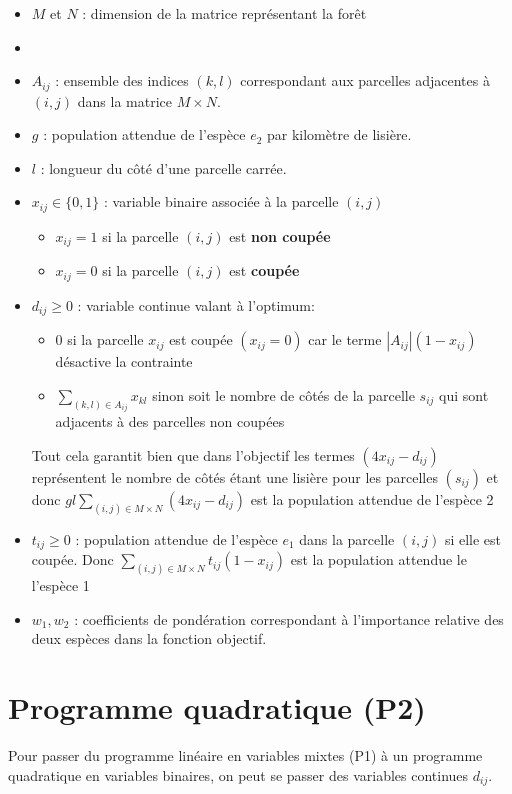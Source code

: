 \documentclass[a4paper,11pt]{article}
\begin{document}
\begin{itemize}
    \item $M$ et $N$ : dimension de la matrice représentant la forêt
    \item \item $A_{ij}$ : ensemble des indices $(k,l)$ correspondant aux parcelles adjacentes à $(i,j)$ dans la matrice $M \times N$.
    \item $g$ : population attendue de l'espèce $e_2$ par kilomètre de lisière.
    \item $l$ : longueur du côté d’une parcelle carrée.
    \item $x_{ij} \in \{0,1\}$ : variable binaire associée à la parcelle $(i,j)$
    \begin{itemize}
        \item $x_{ij} = 1$ si la parcelle $(i,j)$ est \textbf{non coupée}
        \item $x_{ij} = 0$ si la parcelle $(i,j)$ est \textbf{coupée}
    \end{itemize}

    \item {$d_{ij} \ge 0$ : variable continue valant à l'optimum:
    
    \begin{itemize}
    \item $0$ si la parcelle $x_{ij}$ est coupée $(x_{ij} = 0)$ car le terme $|A_{ij}|(1-x_{ij})$ désactive la contrainte
    \item $\sum_{(k,l)\in A_{ij}} x_{kl}$ sinon soit le nombre de côtés de la parcelle $s_{ij}$ qui sont adjacents à des parcelles non coupées 
    \end{itemize} 
    
    Tout cela garantit bien que dans l'objectif les termes $(4x_{ij} - d_{ij})$ représentent le nombre de côtés étant une lisière pour les parcelles $(s_{ij})$ et donc 
    $g l \sum_{(i,j)\in M\times N} (4x_{ij} - d_{ij})$ est la population attendue de l'espèce 2}
    \item $t_{ij} \ge 0$ : population attendue de l'espèce $e_1$ dans la parcelle $(i,j)$ si elle est coupée.
    Donc $\sum_{(i,j)\in M\times N} t_{ij}(1 - x_{ij})$ est la population attendue le l'espèce 1
    \item $w_1, w_2$ : coefficients de pondération correspondant à l’importance relative des deux espèces dans la fonction objectif.
\end{itemize}

\section{Programme quadratique (P2)}
Pour passer du programme linéaire en variables mixtes (P1) à un programme quadratique en variables binaires, on peut se passer des variables continues $d_{ij}$.
\end{document}
